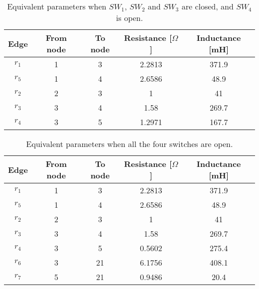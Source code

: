\documentclass[a4paper]{article}
\theoremstyle{plain}
\begin{document}
		\begin{table}[!h]
			\centering
			\begin{tabular}{ccccc}
				\toprule
				Edge & From node & To node & Resistance [$\Omega$] & Inductance [mH] \\
				\midrule
				$r_1$ & 1 & 3 & 2.2813 & 371.9\\
				$r_5$ & 1 & 4 & 2.6586  &   48.9 \\
				$r_2$ & 2 & 3 & 1 & 41\\
				$r_3$ & 3 & 4 & 1.58 &  269.7 \\
				$r_4$ & 3 & 5 & 1.2971 & 167.7 \\
				\bottomrule
			\end{tabular}
			\caption{Equivalent parameters when $SW_1$, $SW_2$ and $SW_3$ are closed, and $SW_4$ is open.}
			\label{Appendix:Table21EqParam3}
		\end{table}
		\begin{table}[!h]
			\centering
			\begin{tabular}{ccccc}
				\toprule
				Edge & From node & To node & Resistance [$\Omega$] & Inductance [mH] \\
				\midrule
				$r_1$ & 1 & 3 & 2.2813 & 371.9\\
				$r_5$ & 1 & 4 &  2.6586 &  48.9  \\
				$r_2$ & 2 & 3 & 1 & 41\\
				$r_3$ & 3 & 4 & 1.58 &  269.7 \\
				$r_4$ & 3 & 5 & 0.5602 & 275.4 \\
				$r_6$ & 3 & 21 &  6.1756 & 408.1 \\
				$r_7$ & 5 & 21 & 0.9486  &   20.4\\
				\bottomrule
			\end{tabular}
			\caption{Equivalent parameters when all the four switches are open.}
			\label{Appendix:Table21EqParam4}
		\end{table}
		
		
      \clearpage
 
     
\end{document}
